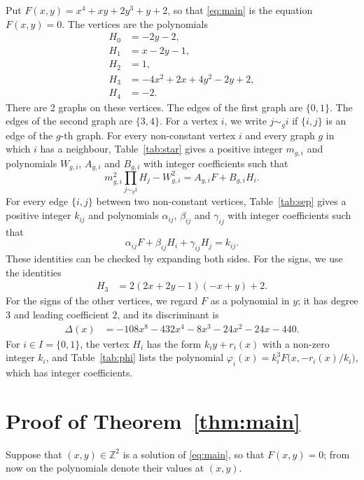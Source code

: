 \documentclass[11pt]{article}
\newcommand{\Z}{\mathbb{Z}}
\begin{document}
Put $F(x,y)=x^{4}+xy+2y^{3}+y+2$, so that \eqref{eq:main} is the equation $F(x,y)=0$. The vertices are the polynomials
\begin{align*}
H_{0}&=-2y-2,\\
H_{1}&=x-2y-1,\\
H_{2}&=1,\\
H_{3}&=-4x^{2}+2x+4y^{2}-2y+2,\\
H_{4}&=-2.
\end{align*}
There are 2 graphs on these vertices. The edges of the first graph are $\{0,1\}$. The edges of the second graph are $\{3,4\}$. For a vertex $i$, we write $j\sim_g i$ if $\{i,j\}$ is an edge of the $g$-th graph.
For every non-constant vertex $i$ and every graph $g$ in which $i$ has a neighbour, Table~\ref{tab:star} gives a positive integer $m_{g,i}$ and polynomials $W_{g,i}$, $A_{g,i}$ and $B_{g,i}$ with integer coefficients such that
\begin{equation}\label{eq:star}
m_{g,i}^2\prod_{j\sim_g i}H_j-W_{g,i}^2=A_{g,i}F+B_{g,i}H_i.
\end{equation}
For every edge $\{i,j\}$ between two non-constant vertices, Table~\ref{tab:sep} gives a positive integer $k_{ij}$ and polynomials $\alpha_{ij}$, $\beta_{ij}$ and $\gamma_{ij}$ with integer coefficients such that
\begin{equation}\label{eq:sep}
\alpha_{ij}F+\beta_{ij}H_i+\gamma_{ij}H_j=k_{ij}.
\end{equation}
These identities can be checked by expanding both sides.
For the signs, we use
the identities
\begin{align}
H_{3}&=2(2x+2y-1)(-x+y)+2.\label{eq:sign3}
\end{align}
For the signs of the other vertices, we regard $F$ as a polynomial in $y$; it has degree $3$ and leading coefficient $2$, and its discriminant is
\begin{align*}
\Delta(x)&=-108x^{8}-432x^{4}-8x^{3}-24x^{2}-24x-440.
\end{align*}
For $i\in I=\{0,\allowbreak 1\}$, the vertex $H_i$ has the form $k_iy+r_i(x)$ with a non-zero integer $k_i$, and Table~\ref{tab:phi} lists the polynomial $\varphi_i(x)=k_i^3F\bigl(x,-r_i(x)/k_i\bigr)$, which has integer coefficients.

\section{Proof of Theorem~\ref{thm:main}}

Suppose that $(x,y)\in\Z^2$ is a solution of \eqref{eq:main}, so that $F(x,y)=0$; from now on the polynomials denote their values at $(x,y)$.
\end{document}
